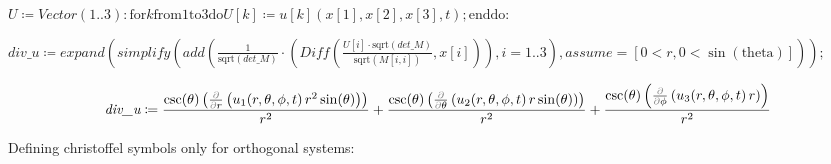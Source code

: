 \documentclass{article}
\begin{document}
\begin{Maple Normal}

\end{Maple Normal}
\begin{Maple Normal}

\end{Maple Normal}
\begin{Maple Normal}
{$ \displaystyle U \coloneqq \mathit{Vector} (1..3)\colon \boldsymbol{\mathrm{for}}k \boldsymbol{\mathrm{from}}1\boldsymbol{\mathrm{to}}3\boldsymbol{\mathrm{do}}U [k]\coloneqq u [k](x [1],x [2],x [3],t);\boldsymbol{\mathrm{end}}\boldsymbol{\mathrm{do}}\colon  $}
\end{Maple Normal}
\begin{Maple Normal}

\end{Maple Normal}
\begin{Maple Normal}

\end{Maple Normal}
\begin{Maple Normal}
{$ \displaystyle \textit{div\_u} \coloneqq \mathit{expand} (\mathit{simplify} (\mathit{add} (\frac{1}{\mathrm{sqrt}(\textit{det\_M})}\cdot (\mathit{Diff} (\frac{U [i]\cdot \mathrm{sqrt}(\textit{det\_M})}{\mathrm{sqrt}(M [i ,i])},x [i])),i =1..3),\mathit{assume} =[0<r ,0<\sin (\mathrm{theta})])); $}
\end{Maple Normal}
\begin{dmath}\label{(7)}
\textit{div\_u} \coloneqq \frac{\csc \! \left(\theta \right) \left(\frac{\textcolor{gray}{\partial}}{\textcolor{gray}{\partial}r}\left(u_{1}\! \left(r ,\theta ,\phi ,t \right) r^{2} \sin \! \left(\theta \right)\right)\right)}{r^{2}}+\frac{\csc \! \left(\theta \right) \left(\frac{\textcolor{gray}{\partial}}{\textcolor{gray}{\partial}\theta}\left(u_{2}\! \left(r ,\theta ,\phi ,t \right) r \sin \! \left(\theta \right)\right)\right)}{r^{2}}+\frac{\csc \! \left(\theta \right) \left(\frac{\textcolor{gray}{\partial}}{\textcolor{gray}{\partial}\phi}\left(u_{3}\! \left(r ,\theta ,\phi ,t \right) r \right)\right)}{r^{2}}
\end{dmath}
\begin{Maple Normal}

\end{Maple Normal}
\begin{Maple Normal}
Defining christoffel symbols only for orthogonal systems:
\end{Maple Normal}
\begin{Maple Normal}

\end{Maple Normal}
\end{document}
